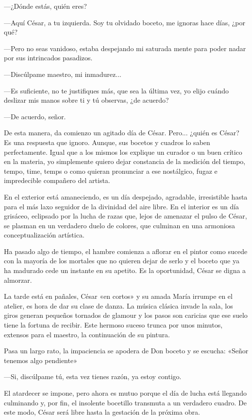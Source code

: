 \documentclass[11pt,twoside,openright,a5paper]{book}
\begin{document}
---¿Dónde estás, quién eres?

---Aquí César, a tu izquierda. Soy tu olvidado boceto, me ignoras hace días, ¿por qué?

---Pero no seas vanidoso, estaba despejando mi saturada mente para poder nadar por sus intrincados pasadizos.

---Discúlpame maestro, mi inmadurez...

---Es suficiente, no te justifiques más, que sea la última vez, yo elijo cuándo deslizar mis manos sobre ti y tú observas, ¿de acuerdo?

---De acuerdo, señor.

De esta manera, da comienzo un agitado día de César. Pero... ¿quién es César? Es una respuesta que ignoro. Aunque, sus bocetos y cuadros lo saben perfectamente. Igual que a los mismos los explique un curador o un buen crítico en la materia, yo simplemente quiero dejar constancia de la medición del tiempo, tempo, time, temps o como quieran pronunciar a ese nostálgico, fugaz e impredecible compañero del artista.

En el exterior está amaneciendo, es un día despejado, agradable, irresistible hasta para el más laxo seguidor de la divinidad del aire libre. En el interior es un día grisáceo, eclipsado por la lucha de razas que, lejos de amenazar el pulso de César, se plasman en un verdadero duelo de colores, que culminan en una armoniosa conceptualización artística.

Ha pasado algo de tiempo, el hambre comienza a aflorar en el pintor como sucede con la mayoría de los mortales que no quieren dejar de serlo y el boceto que ya ha madurado cede un instante en su apetito. Es la oportunidad, César se digna a almorzar.

La tarde está en pañales, César «en cortos» y su amada María irrumpe en el atelier, es hora de dar su clase de danza. La música clásica invade la sala, los giros generan pequeños tornados de glamour y los pasos son caricias que ese suelo tiene la fortuna de recibir. Este hermoso suceso trunca por unos minutos, extensos para el maestro, la continuación de su pintura.

Pasa un largo rato, la impaciencia se apodera de Don boceto y se escucha: «Señor tenemos algo pendiente»

---Si, discúlpame tú, esta vez tienes razón, ya estoy contigo.

El atardecer se impone, pero ahora es mutuo porque el día de lucha está llegando culminando y, por fin, el insolente bocetillo transmuta a un verdadero cuadro. De este modo, César será libre hasta la gestación de la próxima obra.
\end{document}
